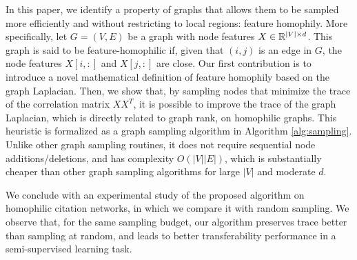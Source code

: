 In this paper, we identify a property of graphs that allows them to be sampled more efficiently and without restricting to local regions: feature homophily. More specifically, let $G=(V,E)$ be a graph with node features $X \in {\mathbb R}^{|V| \times d}$. This graph is said to be feature-homophilic if, given that $(i,j)$ is an edge in $G$, the node features $X[i,:]$ and $X[j,:]$ are close. Our first contribution is to introduce a novel mathematical definition of feature homophily based on the graph Laplacian. Then, we show that, by sampling nodes that minimize the trace of the correlation matrix $XX^T$, it is possible to improve the trace of the graph Laplacian, which is directly related to graph rank, on homophilic graphs. 
This heuristic is formalized as a graph sampling algorithm in Algorithm \ref{alg:sampling}. Unlike other graph sampling routines, it does not require sequential node additions/deletions, and has complexity $O(|V||E|)$, which is substantially cheaper than other graph sampling algorithms for large $|V|$ and moderate $d$. 

We conclude with an experimental study of the proposed algorithm on homophilic citation networks, in which we compare it with random sampling. We observe that, for the same sampling budget, our algorithm preserves trace better than sampling at random, and leads to better transferability performance in a semi-supervised learning task.

